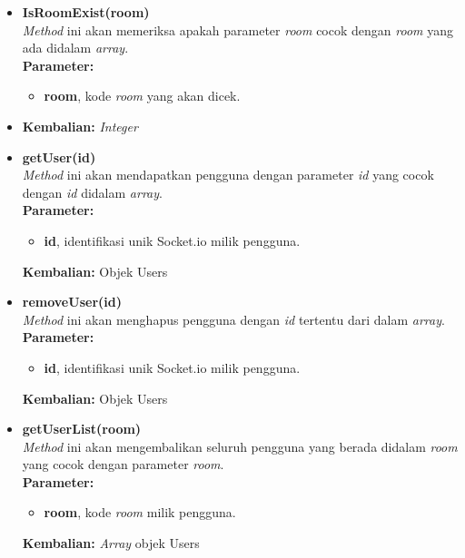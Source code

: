 \begin{enumerate}
\begin{enumerate}
\begin{itemize}
\begin{itemize}
				\item \textbf{IsRoomExist(room)} \\
				\textit{Method} ini akan memeriksa apakah parameter \textit{room} cocok dengan \textit{room} yang ada didalam \textit{array}. \\
				\textbf{Parameter:}
				\begin{itemize}
					\item \textbf{room}, kode \textit{room} yang akan dicek.
				\end{itemize}
				\item \textbf{Kembalian:} \textit{Integer}
				
				\item \textbf{getUser(id)} \\
				\textit{Method} ini akan mendapatkan pengguna dengan parameter \textit{id} yang cocok dengan \textit{id} didalam \textit{array}. \\
				\textbf{Parameter:}
				\begin{itemize}
					\item \textbf{id}, identifikasi unik Socket.io milik pengguna.
				\end{itemize}
				\textbf{Kembalian:} Objek Users
				
				\item \textbf{removeUser(id)} \\ 
				\textit{Method} ini akan menghapus pengguna dengan \textit{id} tertentu dari dalam \textit{array}. \\
				\textbf{Parameter:}
				\begin{itemize}
					\item \textbf{id}, identifikasi unik Socket.io milik pengguna.
				\end{itemize}
				\textbf{Kembalian:} Objek Users
				
				\item \textbf{getUserList(room)} \\
				\textit{Method} ini akan mengembalikan seluruh pengguna yang berada didalam \textit{room} yang cocok dengan parameter \textit{room}. \\
				\textbf{Parameter:}
				\begin{itemize}
					\item \textbf{room}, kode \textit{room} milik pengguna.
				\end{itemize}
				\textbf{Kembalian:} \textit{Array} objek Users
			\end{itemize}
			
		\end{itemize}
	

\end{enumerate}
\end{enumerate}
